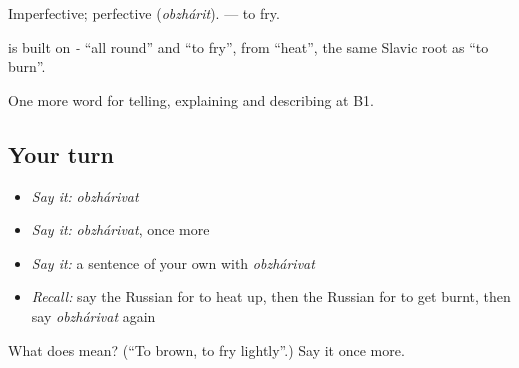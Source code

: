 Imperfective; perfective \emph{} (\emph{obzhárit}). \emph{} — to fry.

\begin{cousinweb}
\emph{} is built on \emph{-} \textquotedblleft{}all round\textquotedblright{} and \emph{} \textquotedblleft{}to fry\textquotedblright{}, from \emph{} \textquotedblleft{}heat\textquotedblright{}, the same Slavic root as \emph{} \textquotedblleft{}to burn\textquotedblright{}.
\end{cousinweb}

\begin{grammarlens}[title={What you've built}]
One more word for telling, explaining and describing at B1.
\end{grammarlens}

\subsection*{Your turn}
\begin{itemize}
\raggedright
  \item \emph{Say it:} \emph{obzhárivat}
  \item \emph{Say it:} \emph{obzhárivat}, once more
  \item \emph{Say it:} a sentence of your own with \emph{obzhárivat}
  \item \emph{Recall:} say the Russian for to heat up, then the Russian for to get burnt, then say \emph{obzhárivat} again
\end{itemize}

\begin{tcolorbox}[breakable,colback=teal!4,colframe=teal!35!black,title={Before you move on}]
What does  mean? (\textquotedblleft{}To brown, to fry lightly\textquotedblright{}.) Say it once more.
\end{tcolorbox}
